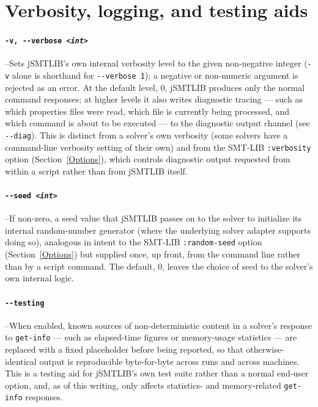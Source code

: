\documentclass[12pt,oneside]{report}
\begin{document}
\section{Verbosity, logging, and testing aids}

\paragraph{\tt -v, -{}-verbose \it <int>}\label{opt:verbose} --Sets jSMTLIB's own internal verbosity level to the given non-negative integer ({\tt -v} alone is shorthand for {\tt -{}-verbose 1}); a negative or non-numeric argument is rejected as an error. At the default level, 0, jSMTLIB produces only the normal command responses; at higher levels it also writes diagnostic tracing --- such as which properties files were read, which file is currently being processed, and which command is about to be executed --- to the diagnostic output channel (see {\tt -{}-diag}). This is distinct from a solver's own verbosity (some solvers have a command-line verbosity setting of their own) and from the SMT-LIB {\tt :verbosity} option (Section~\ref{Options}), which controls diagnostic output requested from within a script rather than from jSMTLIB itself.

\paragraph{\tt -{}-seed \it <int>}\label{opt:seed} --If non-zero, a seed value that jSMTLIB passes on to the solver to initialize its internal random-number generator (where the underlying solver adapter supports doing so), analogous in intent to the SMT-LIB {\tt :random-seed} option (Section~\ref{Options}) but supplied once, up front, from the command line rather than by a script command. The default, 0, leaves the choice of seed to the solver's own internal logic.

\paragraph{\tt -{}-testing}\label{opt:testing} --When enabled, known sources of non-deterministic content in a solver's response to {\tt get-info} --- such as elapsed-time figures or memory-usage statistics --- are replaced with a fixed placeholder before being reported, so that otherwise-identical output is reproducible byte-for-byte across runs and across machines. This is a testing aid for jSMTLIB's own test suite rather than a normal end-user option, and, as of this writing, only affects statistics- and memory-related {\tt get-info} responses.
\end{document}
